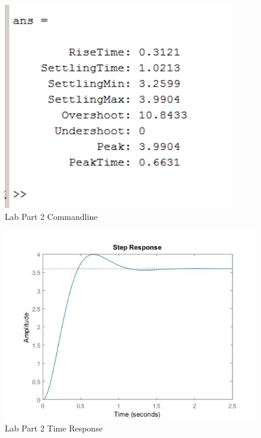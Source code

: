 \documentclass[12pt]{article}
\begin{document}
\begin{figure}[h!] %
   \centering
   \includegraphics[width=4in]{part_2_commandline.jpg} 
   \caption{Lab Part 2 Commandline}
   \label{fig:example}
\end{figure}

\newpage

\begin{figure}[h!] %
   \centering
   \includegraphics[width=\linewidth]{part_2_time_response.jpg} 
   \caption{Lab Part 2 Time Response}
   \label{fig:example}
\end{figure}
\bigskip



\end{document}
